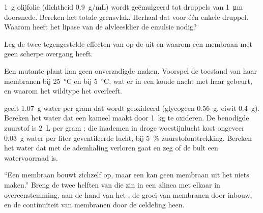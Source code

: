 \begin{exercise}[$\star\star$]\label{exo:b1:lipids:8}
\qty{1}{g} olijfolie (dichtheid \qty{0.9}{g/mL}) wordt geëmulgeerd tot druppels van
\qty{1}{\micro m} doorsnede. Bereken het totale grensvlak. Herhaal dat voor één
enkele druppel. Waarom heeft het lipase van de alvleesklier de emulsie nodig?
\end{exercise}

\begin{exercise}[$\star\star$]\label{exo:b1:lipids:9}
Leg de twee tegengestelde effecten van  op de  uit
en waarom een membraan met  geen scherpe overgang heeft.
\end{exercise}

\begin{exercise}[$\star\star\star$]\label{exo:b1:lipids:10}
Een mutante plant kan geen onverzadigde  maken. Voorspel de toestand van
haar membranen bij \qty{25}{\celsius} en bij \qty{5}{\celsius}, wat er in een
koude nacht met haar  gebeurt, en waarom het wildtype het overleeft.
\end{exercise}

\begin{exercise}[$\star\star\star$]\label{exo:b1:lipids:11}
 geeft \qty{1.07}{g} water per gram dat wordt geoxideerd (glycogeen
\qty{0.56}{g}, eiwit \qty{0.4}{g}). Bereken het water dat een kameel maakt door
\qty{1}{kg}  te oxideren. De benodigde zuurstof is \qty{2}{L} per gram ; die
inademen in droge woestijnlucht kost ongeveer \qty{0.03}{g} water per liter
geventileerde lucht, bij \qty{5}{\%} zuurstofonttrekking. Bereken het water dat
met de ademhaling verloren gaat en zeg of de bult een watervoorraad is.
\end{exercise}

\begin{exercise}[$\star\star\star$]\label{exo:b1:lipids:12}
``Een membraan bouwt zichzelf op, maar een  kan geen membraan uit het niets
maken.'' Breng de twee helften van die zin in een alinea met elkaar in
overeenstemming, aan de hand van het , de groei van membranen door
inbouw, en de continuïteit van membranen door de celdeling heen.
\end{exercise}

